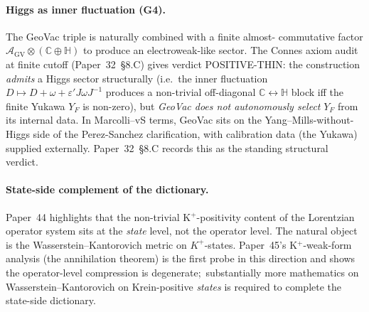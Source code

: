 \documentclass[11pt,a4paper]{article}
\theoremstyle{plain}
\theoremstyle{definition}
\newcommand{\AGV}{\mathcal{A}_{\mathrm{GV}}}
\newcommand{\C}{\mathbb{C}}
\begin{document}
\paragraph{Higgs as inner fluctuation (G4).}
The GeoVac triple is naturally combined with a finite almost-
commutative factor $\AGV \otimes (\C \oplus \mathbb{H})$ to produce
an electroweak-like sector.  The Connes axiom audit at finite cutoff
(Paper~32~\S 8.C) gives verdict POSITIVE-THIN: the construction
\emph{admits} a Higgs sector structurally (i.e.~the inner fluctuation
$D \mapsto D + \omega + \varepsilon' J \omega J^{-1}$ produces a
non-trivial off-diagonal $\mathbb{C} \leftrightarrow \mathbb{H}$
block iff the finite Yukawa $Y_{F}$ is non-zero), but \emph{GeoVac
does not autonomously select} $Y_{F}$ from its internal data.  In
Marcolli--vS terms, GeoVac sits on the Yang--Mills-without-Higgs side
of the Perez-Sanchez \cite{perez_sanchez2025}
clarification, with calibration data (the Yukawa) supplied externally.
Paper~32~\S 8.C records this as the standing structural verdict.

\paragraph{State-side complement of the dictionary.}
Paper~44 highlights that the non-trivial K$^{+}$-positivity content of
the Lorentzian operator system sits at the \emph{state} level, not the
operator level.  The natural object is the Wasserstein--Kantorovich
metric on $K^{+}$-states.  Paper~45's K$^{+}$-weak-form analysis (the annihilation theorem)
is the first probe in this direction and shows the operator-level
compression is degenerate;\ substantially more mathematics on
Wasserstein--Kantorovich on Krein-positive \emph{states} is required
to complete the state-side dictionary.
\end{document}
